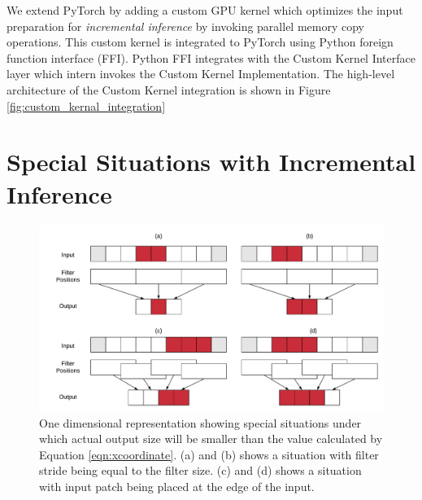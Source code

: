 We extend PyTorch by adding a custom GPU kernel which optimizes the input preparation for \textit{incremental inference} by invoking parallel memory copy operations.
This custom kernel is integrated to PyTorch using Python foreign function interface (FFI).
Python FFI integrates with the Custom Kernel Interface layer which intern invokes the Custom Kernel Implementation.
The high-level architecture of the Custom Kernel integration is shown in Figure \ref{fig:custom_kernal_integration}






\section{Special Situations with Incremental Inference}

\begin{figure}[t]
\includegraphics[width=\columnwidth]{images/less_one_example}
\caption{One dimensional representation showing special situations under which actual output size will be smaller than the value calculated by Equation \ref{eqn:xcoordinate}. (a) and (b) shows a situation with filter stride being equal to the filter size. (c) and (d) shows a situation with input patch being placed at the edge of the input.}
\label{fig:less_one_example}
\end{figure}


